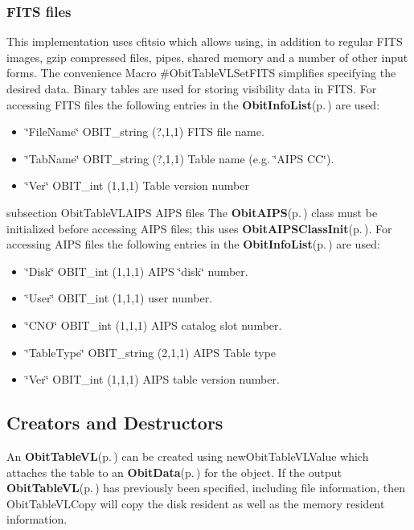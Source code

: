 \subsubsection{FITS files}\label{ObitTableWX_8h_TableFITS}
This implementation uses cfitsio which allows using, in addition to regular FITS images, gzip compressed files, pipes, shared memory and a number of other input forms. The convenience Macro \#Obit\-Table\-VLSet\-FITS simplifies specifying the desired data. Binary tables are used for storing visibility data in FITS. For accessing FITS files the following entries in the {\bf Obit\-Info\-List}{\rm (p.\,\pageref{structObitInfoList})} are used: \begin{itemize}
\item \char`\"{}File\-Name\char`\"{} OBIT\_\-string (?,1,1) FITS file name. \item \char`\"{}Tab\-Name\char`\"{} OBIT\_\-string (?,1,1) Table name (e.g. \char`\"{}AIPS CC\char`\"{}). \item \char`\"{}Ver\char`\"{} OBIT\_\-int (1,1,1) Table version number\end{itemize}
subsection Obit\-Table\-VLAIPS AIPS files The {\bf Obit\-AIPS}{\rm (p.\,\pageref{structObitAIPS})} class must be initialized before accessing AIPS files; this uses {\bf Obit\-AIPSClass\-Init}{\rm (p.\,\pageref{ObitAIPS_8c_a5})}. For accessing AIPS files the following entries in the {\bf Obit\-Info\-List}{\rm (p.\,\pageref{structObitInfoList})} are used: \begin{itemize}
\item \char`\"{}Disk\char`\"{} OBIT\_\-int (1,1,1) AIPS \char`\"{}disk\char`\"{} number. \item \char`\"{}User\char`\"{} OBIT\_\-int (1,1,1) user number. \item \char`\"{}CNO\char`\"{} OBIT\_\-int (1,1,1) AIPS catalog slot number. \item \char`\"{}Table\-Type\char`\"{} OBIT\_\-string (2,1,1) AIPS Table type \item \char`\"{}Ver\char`\"{} OBIT\_\-int (1,1,1) AIPS table version number.\end{itemize}
\subsection{Creators and Destructors}\label{ObitTableVL_8h_ObitTableVLaccess}
An {\bf Obit\-Table\-VL}{\rm (p.\,\pageref{structObitTableVL})} can be created using new\-Obit\-Table\-VLValue which attaches the table to an {\bf Obit\-Data}{\rm (p.\,\pageref{structObitData})} for the object. If the output {\bf Obit\-Table\-VL}{\rm (p.\,\pageref{structObitTableVL})} has previously been specified, including file information, then Obit\-Table\-VLCopy will copy the disk resident as well as the memory resident information.

